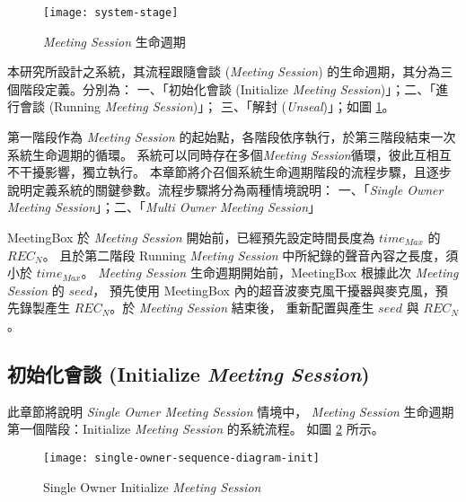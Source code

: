 \begin{figure}[H]
    \centering
    \texttt{[image: system-stage]}
    \caption{{\it Meeting Session} 生命週期}
    \label{fig.system-stage}
\end{figure}

    本研究所設計之系統，其流程跟隨會談 ({\it Meeting Session}) 的生命週期，其分為三個階段定義。分別為：
一、「初始化會談 (Initialize {\it Meeting Session})」；二、「進行會談 (Running {\it Meeting Session})」；
三、「解封 ({\it Unseal})」；如圖 \ref{fig.system-stage}。

    第一階段作為 {\it Meeting Session} 的起始點，各階段依序執行，於第三階段結束一次系統生命週期的循環。
系統可以同時存在多個{\it Meeting Session}循環，彼此互相互不干擾影響，獨立執行。
本章節將介召個系統生命週期階段的流程步驟，且逐步說明定義系統的關鍵參數。流程步驟將分為兩種情境說明：
一、「{\it Single Owner Meeting Session}」；二、「{\it Multi Owner Meeting Session}」

    MeetingBox 於 {\it Meeting Session} 開始前，已經預先設定時間長度為 $time_{Max}$ 的 $REC_{N}$。
且於第二階段 Running {\it Meeting Session} 中所紀錄的聲音內容之長度，須小於  $time_{Max}$。
{\it Meeting Session} 生命週期開始前，MeetingBox 根據此次 {\it Meeting Session} 的 $seed$，
預先使用 MeetingBox 內的超音波麥克風干擾器與麥克風，預先錄製產生 $REC_{N}$。於 {\it Meeting Session} 結束後，
重新配置與產生 $seed$ 與 $REC_{N}$。


\subsection{初始化會談 (Initialize {\it Meeting Session})}

    此章節將說明 {\it Single Owner Meeting Session} 情境中，
{\it Meeting Session} 生命週期第一個階段：Initialize {\it Meeting Session} 的系統流程。
如圖 \ref{fig.s-o-init} 所示。

\begin{figure}[H]
    \centering
    \texttt{[image: single-owner-sequence-diagram-init]}
    \caption{Single Owner Initialize {\it Meeting Session}}
    \label{fig.s-o-init}
\end{figure}

